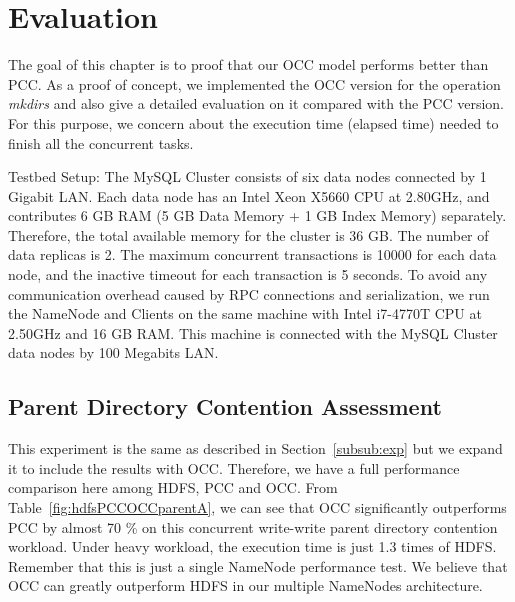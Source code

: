 \documentclass[runningheads,a4paper]{llncs}
\begin{document}
\section{Evaluation}
\label{sec:eva}
The goal of this chapter is to proof that our OCC model performs better than PCC. As a proof of concept, we implemented the OCC version for the operation \textit{mkdirs} and also give a detailed evaluation on it compared with the PCC version. For this purpose, we concern about the execution time (elapsed time) needed to finish all the concurrent tasks.

Testbed Setup: The MySQL Cluster consists of six data nodes connected by 1 Gigabit LAN. Each data node has an Intel Xeon X5660 CPU at 2.80GHz, and contributes 6 GB RAM (5 GB Data Memory + 1 GB Index Memory) separately. Therefore, the total available memory for the cluster is 36 GB. The number of data replicas is 2. The maximum concurrent transactions is 10000 for each data node, and the inactive timeout for each transaction is 5 seconds. To avoid any communication overhead caused by RPC connections and serialization, we run the NameNode and Clients on the same machine with Intel i7-4770T CPU at 2.50GHz and 16 GB RAM. This machine is connected with the MySQL Cluster data nodes by 100 Megabits LAN.

\subsection{Parent Directory Contention Assessment}
This experiment is the same as described in Section~\ref{subsub:exp} but we expand it to include the results with OCC. Therefore, we have a full performance comparison here among HDFS, PCC and OCC. From Table~\ref{fig:hdfsPCCOCCparentA}, we can see that OCC significantly outperforms PCC by almost 70 \% on this concurrent write-write parent directory contention workload. Under heavy workload, the execution time is just 1.3 times of HDFS. Remember that this is just a single NameNode performance test. We believe that OCC can greatly outperform HDFS in our multiple NameNodes architecture.
\end{document}
